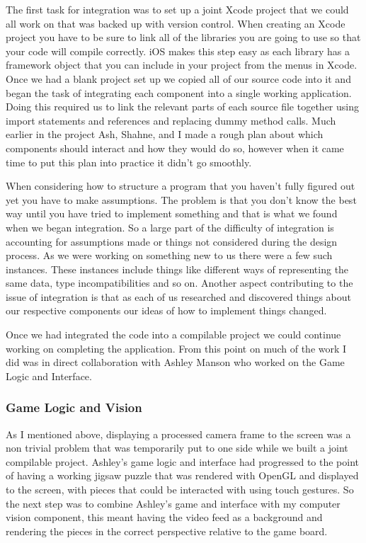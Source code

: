 \documentclass{article}
\begin{document}
The first task for integration was to set up a joint Xcode project that we could all work on that was backed up with version control. When creating an Xcode project you have to be sure to link all of the libraries you are going to use so that your code will compile correctly. iOS makes this step easy as each library has a framework object that you can include in your project from the menus in Xcode. Once we had a blank project set up we copied all of our source code into it and began the task of integrating each component into a single working application. Doing this required us to link the relevant parts of each source file together using import statements and references and replacing dummy method calls. Much earlier in the project Ash, Shahne, and I made a rough plan about which components should interact and how they would do so, however when it came time to put this plan into practice it didn't go smoothly. 

When considering how to structure a program that you haven't fully figured out yet you have to make assumptions. The problem is that you don't know the best way until you have tried to implement something and that is what we found when we began integration. So a large part of the difficulty of integration is accounting for assumptions made or things not considered during the design process. As we were working on something new to us there were a few such instances. These instances include things like different ways of representing the same data, type incompatibilities and so on. Another aspect contributing to the issue of integration is that as each of us researched and discovered things about our respective components our ideas of how to implement things changed.

Once we had integrated the code into a compilable project we could continue working on completing the application. From this point on much of the work I did was in direct collaboration with Ashley Manson who worked on the Game Logic and Interface. 

\subsubsection{Game Logic and Vision}




As I mentioned above, displaying a processed camera frame to the screen was a non trivial problem that was temporarily put to one side while we built a joint compilable project. Ashley's game logic and interface had progressed to the point of having a working jigsaw puzzle that was rendered with OpenGL and displayed to the screen, with pieces that could be interacted with using touch gestures. So the next step was to combine Ashley's game and interface with my computer vision component, this meant having the video feed as a background and rendering the pieces in the correct perspective relative to the game board. 
\end{document}
